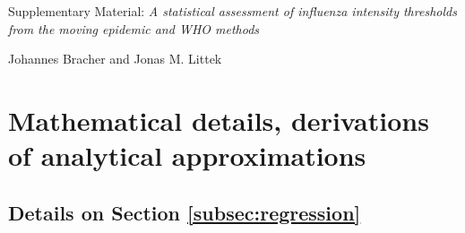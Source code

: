 \documentclass[12pt]{article}
\begin{document}
\begin{center}
{\LARGE Supplementary Material: \textit{A statistical assessment of influenza intensity thresholds from the moving epidemic and WHO methods}}

\medskip

{\large Johannes Bracher and Jonas M. Littek}
\end{center}



\section{Mathematical details, derivations of analytical approximations}
\label{appendix:derivations}

\subsection{Details on Section \ref{subsec:regression}}
\label{suppl:regression}
\end{document}
